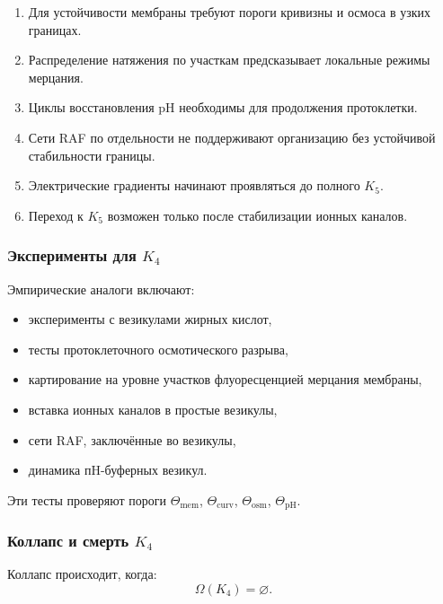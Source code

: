 {\begin{enumerate}
    \item Для устойчивости мембраны требуют пороги кривизны и осмоса в
          узких границах.
    \item Распределение натяжения по участкам предсказывает локальные
          режимы мерцания.
    \item Циклы восстановления pH необходимы для продолжения протоклетки.
    \item Сети RAF по отдельности не поддерживают организацию без
          устойчивой стабильности границы.
    \item Электрические градиенты начинают проявляться до полного $K_5$.
    \item Переход к $K_5$ возможен только после стабилизации ионных
          каналов.
\end{enumerate}

\subsubsection{Эксперименты для \texorpdfstring{$K_4$}{K_4}}

Эмпирические аналоги включают:
\begin{itemize}
    \item эксперименты с везикулами жирных кислот,
    \item тесты протоклеточного осмотического разрыва,
    \item картирование на уровне участков флуоресценцией мерцания мембраны,
    \item вставка ионных каналов в простые везикулы,
    \item сети RAF, заключённые во везикулы,
    \item динамика пH-буферных везикул.
\end{itemize}

Эти тесты проверяют пороги $\Theta_{\mathrm{mem}}$,
$\Theta_{\mathrm{curv}}$, $\Theta_{\mathrm{osm}}$,
$\Theta_{\mathrm{pH}}$.

\subsubsection{Коллапс и смерть \texorpdfstring{$K_4$}{K_4}}

Коллапс происходит, когда:
\[
\Omega(K_4) = \varnothing.
\]

}
